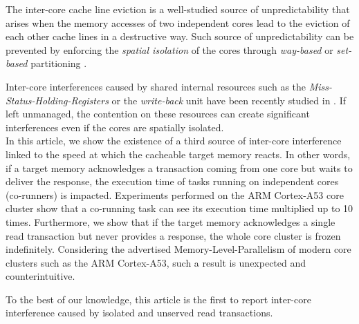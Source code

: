     The inter-core cache line eviction is a well-studied source of unpredictability that arises when the memory accesses of two independent cores lead to the eviction of each other cache lines in a destructive way.
    Such source of unpredictability can be prevented by enforcing the \emph{spatial isolation} of the cores through \emph{way-based} or \emph{set-based} partitioning \cite{Mancuso2013RealtimeCM, 6755286, Giovani_cahe_partitioning_survey}.

    Inter-core interferences caused by shared internal resources such as the \emph{Miss-Status-Holding-Registers} or the \emph{write-back} unit have been recently studied in \cite{Valsan2017AddressingIC, Heechul_DDOS_attacks_on_shared_cache}.
    If left unmanaged, the contention on these resources can create significant interferences even if the cores are spatially isolated.\\

    In this article, we show the existence of a third source of inter-core interference linked to the speed at which the cacheable target memory reacts.
    In other words, if a target memory acknowledges a transaction coming from one core but waits to deliver the response, the execution time of tasks running on independent cores (co-runners) is impacted.
    Experiments performed on the ARM Cortex-A53 core cluster \cite{ARM-cortex-A53} show that a co-running task can see its execution time multiplied up to 10 times.
    Furthermore, we show that if the target memory acknowledges a single read transaction but never provides a response, the whole core cluster is frozen indefinitely.
    Considering the advertised Memory-Level-Parallelism of modern core clusters such as the ARM Cortex-A53, such a result is unexpected and counterintuitive.


    To the best of our knowledge, this article is the first to report inter-core interference caused by isolated and unserved read transactions.

